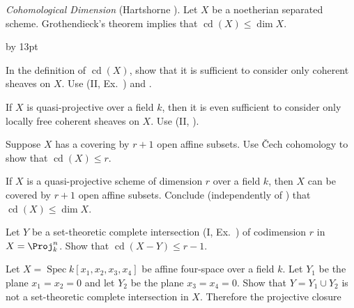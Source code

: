 {{\smallskip
\noindent\hypertarget{ex-III-4.8}{}\emph{Cohomological Dimension} (Hartshorne ). Let $X$ be a noetherian separated scheme.
Grothendieck's theorem  implies that $\operatorname{cd}(X)\leq\dim X$.
{\advance\leftskip by 13pt\par
\noindent\hypertarget{ex-III-4.8a}{}In the definition of $\operatorname{cd}(X)$, show that it is sufficient to consider only coherent sheaves on $X$. Use (II, Ex.~) and .

\noindent\hypertarget{ex-III-4.8b}{}If $X$ is quasi-projective over a field $k$, then it is even sufficient to consider only locally free coherent sheaves on $X$. Use (II, ).

\noindent\hypertarget{ex-III-4.8c}{}Suppose $X$ has a covering by $r+1$ open affine subsets. Use \v{C}ech cohomology to show that $\operatorname{cd}(X)\leq r$.

\noindent\hypertarget{ex-III-4.8d}{}If $X$ is a quasi-projective scheme of dimension $r$ over a field $k$, then $X$ can be covered by $r+1$ open affine subsets. Conclude (independently of ) that $\operatorname{cd}(X)\leq\dim X$.

\noindent\hypertarget{ex-III-4.8e}{}Let $Y$ be a set-theoretic complete intersection (I, Ex.~) of codimension $r$ in $X=\Proj_k^n$. Show that $\operatorname{cd}(X-Y)\leq r-1$.\par}

\smallskip
\noindent\hypertarget{ex-III-4.9}{}Let $X=\operatorname{Spec}k[x_1,x_2,x_3,x_4]$ be affine four-space over a field $k$. Let $Y_1$ be the plane $x_1=x_2=0$ and let $Y_2$ be the plane $x_3=x_4=0$. Show that $Y=Y_1\cup Y_2$ is not a set-theoretic complete intersection in $X$. Therefore the projective closure\par}
}
